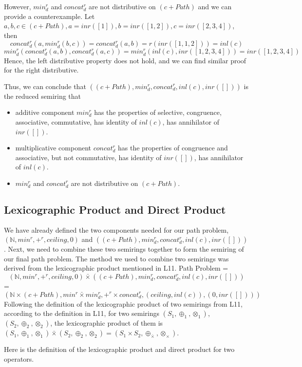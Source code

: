 \documentclass[a4paper,12pt,twoside,openright]{report}
\begin{document}
However, $min^r_d$ and $concat^r_d$ are not distributive on $(c + Path)$ and we can provide a counterexample. Let $a,b,c \in (c + Path), a = inr([1]), b = inr([1,2]), c = inr([2,3,4])$, then 
\[concat^r_d (a,min^r_d(b,c)) = concat^r_d (a,b) = r(inr([1,1,2])) = inl(c)\]
\[min^r_d (concat^r_d(a,b),concat^r_d(a,c)) = min^r_d (inl(c),inr([1,2,3,4])) = inr([1,2,3,4])\]
Hence, the left distributive property does not hold, and we can find similar proof for the right distributive.

Thus, we can conclude that $((c + Path),min^r_d,concat^r_d,inl(c),inr([]))$ is the reduced semiring that 
\begin{itemize}
  \item additive component $min^r_d$ has the properties of selective, congruence, associative, commutative, has identity of $inl(c)$, has annihilator of $inr([])$.
  \item multiplicative component $concat^r_d$ has the properties of congruence and associative, but not commutative, has identity of $inr([])$, has annihilator of $inl(c)$.
  \item $min^r_d$ and $concat^r_d$ are not distributive on $(c + Path)$.
\end{itemize}

\subsection{Lexicographic Product and Direct Product}
We have already defined the two components needed for our path problem, $(\mathbb{N},min^r,+^r,ceiling,0)$ and $((c + Path),min^r_d,concat^r_d,inl(c),inr([]))$. 
Next, we need to combine these two semirings together to form the semiring of our final path problem. The method we used to combine two semirings was derived from the lexicographic product mentioned in L11. Path Problem =
\[(\mathbb{N},min^r,+^r,ceiling,0) \bar{\times} ((c + Path),min^r_d,concat^r_d,inl(c),inr([]))\]
=
\[(\mathbb{N} \times (c + Path), min^r \bar{\times} min^r_d, +^r \times concat^r_d, (ceiling,inl(c)), (0,inr([])))\]
Following the definition of the lexicographic product of two semirings from L11, according to the definition in L11, for two semirings $(S_1,\oplus_1,\otimes_1)$,$(S_2,\oplus_2,\otimes_2)$, the lexicographic product of them is $(S_1,\oplus_1,\otimes_1) \bar{\times} (S_2,\oplus_2,\otimes_2) = (S_1\times S_2, \oplus_{\bar{\times}}, \otimes_\times)$.

Here is the definition of the lexicographic product and direct product for two operators. 
\end{document}
